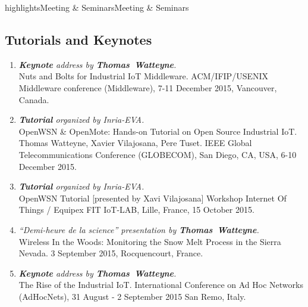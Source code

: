 \documentclass{ra2016}
\newcommand{\thomas}           {\textbf{Thomas~Watteyne}}
\begin{document}
\begin{module}{highlights}{Meeting \& Seminars}{Meeting \& Seminars}
\label{sec:meetingseminars}

\subsection{Tutorials and Keynotes}
\begin{enumerate}
    \item \textit{\textbf{Keynote} address by \thomas.}\\
        Nuts and Bolts for Industrial IoT Middleware. ACM/IFIP/USENIX Middleware conference (Middleware), 7-11 December 2015, Vancouver, Canada.
    \item \textit{\textbf{Tutorial} organized by Inria-EVA.}\\
        OpenWSN \& OpenMote: Hands-on Tutorial on Open Source Industrial IoT. Thomas Watteyne, Xavier Vilajosana, Pere Tuset. IEEE Global Telecommunications Conference (GLOBECOM), San Diego, CA, USA, 6-10 December 2015.
    \item \textit{\textbf{Tutorial} organized by Inria-EVA.}\\
        OpenWSN Tutorial [presented by Xavi Vilajosana] Workshop Internet Of Things / Equipex FIT IoT-LAB, Lille, France, 15 October 2015.
    \item \textit{``Demi-heure de la science'' presentation by \thomas.}\\
        Wireless In the Woods: Monitoring the Snow Melt Process in the Sierra Nevada. 3 September 2015, Rocquencourt, France.
    \item \textit{\textbf{Keynote} address by \thomas.}\\
        The Rise of the Industrial IoT. International Conference on Ad Hoc Networks (AdHocNets), 31 August - 2 September 2015 San Remo, Italy.
\end{enumerate}


\end{module}
\end{document}

